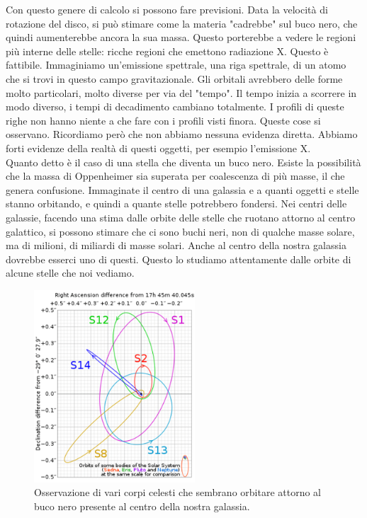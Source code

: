 \documentclass[a4paper,11pt]{article}
\begin{document}
Con questo genere di calcolo si possono fare previsioni. Data la velocità di rotazione del disco, si può stimare come la materia "cadrebbe" sul buco nero, che quindi aumenterebbe ancora la sua massa. Questo porterebbe a vedere le regioni più interne delle stelle: ricche regioni che emettono radiazione X. Questo è fattibile. Immaginiamo un'emissione spettrale, una riga spettrale, di un atomo che si trovi in questo campo gravitazionale. Gli orbitali avrebbero delle forme molto particolari, molto diverse per via del "tempo". Il tempo inizia a scorrere in modo diverso, i tempi di decadimento cambiano totalmente. I profili di queste righe non hanno niente a che fare con i profili visti finora. Queste cose si osservano. Ricordiamo però che non abbiamo nessuna evidenza diretta. Abbiamo forti evidenze della realtà di questi oggetti, per esempio l'emissione X. \\ Quanto detto è il caso di una stella che diventa un buco nero. Esiste la possibilità che la massa di Oppenheimer sia superata per coalescenza di più masse, il che genera confusione. Immaginate il centro di una galassia e a quanti oggetti e stelle stanno orbitando, e quindi a quante stelle potrebbero fondersi. Nei centri delle galassie, facendo una stima dalle orbite delle stelle che ruotano attorno al centro galattico, si possono stimare che ci sono buchi neri, non di qualche masse solare, ma di milioni, di miliardi di masse solari. Anche al centro della nostra galassia dovrebbe esserci uno di questi. Questo lo studiamo attentamente dalle orbite di alcune stelle che noi vediamo.
\begin{figure}[h!!]
        \centering
        \includegraphics[width=6cm]{lezione 28 novembre/centrogalattico.png}
        \caption{Osservazione di vari corpi celesti che sembrano orbitare attorno al buco nero presente al centro della nostra galassia.}
        \label{lezione 28 novembre/centrogalattico.png}
    \end{figure}
\end{document}
